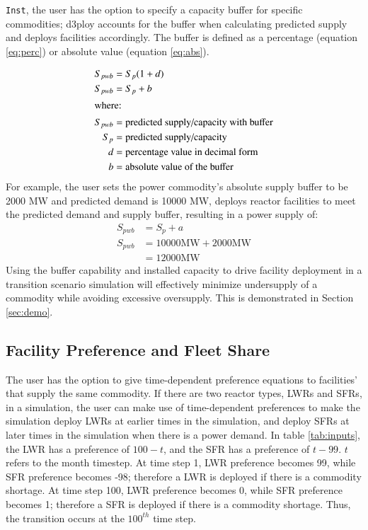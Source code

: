 \noindent 
\texttt{Inst},
the user has the option to specify a capacity buffer for specific 
commodities; d3ploy accounts for the buffer when calculating predicted 
supply and deploys facilities accordingly. 
The buffer is defined as a percentage (equation \ref{eq:perc}) 
or absolute value (equation \ref{eq:abs}). 

\begin{align}
    \label{eq:perc}
	S_{pwb} &= S_{p}(1+d)\\
	\label{eq:abs}
	S_{pwb} &= S_{p}+b \\
	\intertext{where:}
	S_{pwb} &= \mbox{predicted supply/capacity with buffer} \nonumber\\
	S_p &= \mbox{predicted supply/capacity} \nonumber\\
	d &= \mbox{percentage value in decimal form} \nonumber\\
    b &= \mbox{absolute value of the buffer} \nonumber
\end{align}
For example, the user sets the power commodity's absolute supply buffer 
to be 2000 MW and predicted demand is 10000 MW, \deploy deploys reactor 
facilities to meet the predicted demand and supply buffer, resulting 
in a power supply of: 
\begin{align*}
	S_{pwb} &= S_{p}+a \\
	S_{pwb} &= 10000 \mbox{MW}+2000 \mbox{MW} \\
	&= 12000\mbox{MW}
\end{align*}
Using the buffer capability and  
installed capacity to drive facility deployment in a transition 
scenario simulation will effectively minimize undersupply of a 
commodity while avoiding excessive oversupply. 
This is demonstrated in Section \ref{sec:demo}. 

\subsection{Facility Preference and Fleet Share}

The user has the option to give time-dependent preference 
equations to facilities' that supply the same commodity. 
If there are two reactor types, \glspl{LWR} and \glspl{SFR}, in a simulation, 
the user can make use of time-dependent 
preferences to make the simulation deploy LWRs at earlier times 
in the simulation, and deploy SFRs at later times in the 
simulation when there is a power demand. 
In table \ref{tab:inputs}, 
the LWR has a preference of $100-t$, and the 
SFR has a preference of $t-99$. 
$t$ refers to the month timestep. 
At time step 1, LWR preference becomes 99, while SFR preference becomes -98; 
therefore a LWR is deployed if there is a commodity shortage. 
At time step 100, LWR preference becomes 0, while SFR preference becomes 1; 
therefore a SFR is deployed if there is a commodity shortage. 
Thus, the transition occurs at the $100^{th}$ time step.


